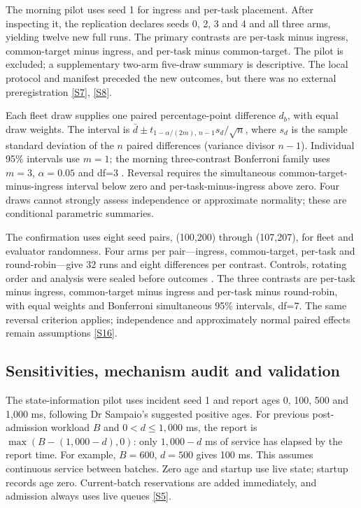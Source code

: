\documentclass[12pt,a4paper]{article}
\begin{document}
The morning pilot uses seed 1 for ingress and per-task placement. After inspecting it, the replication declares seeds 0, 2, 3 and 4 and all three arms, yielding twelve new full runs. The primary contrasts are per-task minus ingress, common-target minus ingress, and per-task minus common-target. The pilot is excluded; a supplementary two-arm five-draw summary is descriptive. The local protocol and manifest preceded the new outcomes, but there was no external preregistration \cite{ref33} \hyperref[source-s7]{[S7]}, \hyperref[source-s8]{[S8]}.

Each fleet draw supplies one paired percentage-point difference $d_b$, with equal draw weights. The interval is $\bar d\pm t_{1-\alpha/(2m),\,n-1}s_d/\sqrt n$, where $s_d$ is the sample standard deviation of the $n$ paired differences (variance divisor $n-1$). Individual 95\% intervals use $m=1$; the morning three-contrast Bonferroni family uses $m=3$, $\alpha=0.05$ and df=3 \cite{ref34}. Reversal requires the simultaneous common-target-minus-ingress interval below zero and per-task-minus-ingress above zero. Four draws cannot strongly assess independence or approximate normality; these are conditional parametric summaries.

The confirmation uses eight seed pairs, (100,200) through (107,207), for fleet and evaluator randomness. Four arms per pair---ingress, common-target, per-task and round-robin---give 32 runs and eight differences per contrast. Controls, rotating order and analysis were sealed before outcomes \cite{ref33}. The three contrasts are per-task minus ingress, common-target minus ingress and per-task minus round-robin, with equal weights and Bonferroni simultaneous 95\% intervals, df=7. The same reversal criterion applies; independence and approximately normal paired effects remain assumptions \hyperref[source-s16]{[S16]}.

\FloatBarrier
\subsection{Sensitivities, mechanism audit and validation}\label{sec:2.7}

The state-information pilot uses incident seed 1 and report ages 0, 100, 500 and 1,000 ms, following Dr Sampaio's suggested positive ages. For previous post-admission workload $B$ and $0<d\leq1{,}000$ ms, the report is $\max(B-(1{,}000-d),0)$: only $1{,}000-d$ ms of service has elapsed by the report time. For example, $B=600$, $d=500$ gives 100 ms. This assumes continuous service between batches. Zero age and startup use live state; startup records age zero. Current-batch reservations are added immediately, and admission always uses live queues \hyperref[source-s5]{[S5]}.
\end{document}
